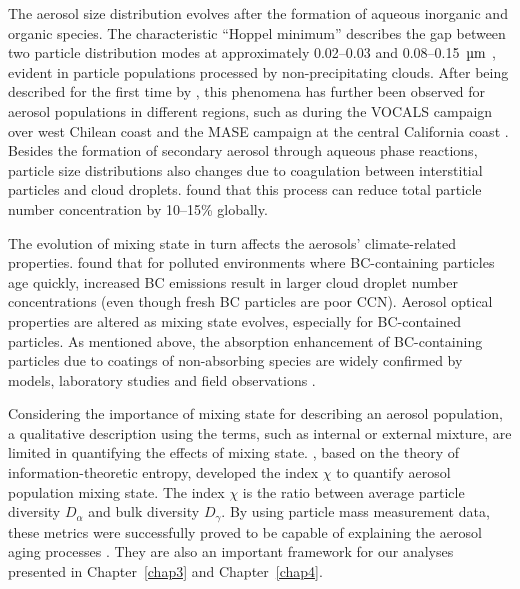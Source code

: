\documentclass[edeposit,fullpage]{uiucthesis2009}
\begin{document}
The aerosol size distribution evolves after the formation of aqueous
inorganic and organic species. The characteristic ``Hoppel minimum''
describes the gap between two particle distribution modes at
approximately 0.02--0.03 and 0.08--0.15~$\rm \mu m$
\citep{Hoppel1986}, evident in particle populations processed by
non-precipitating clouds. After being described for the first time by
\citet{Hoppel1986}, this phenomena has further been observed for
aerosol populations in different regions, such as during the VOCALS
campaign over west Chilean coast \citep{kleinman2012aerosol} and the
MASE campaign at the central California coast
\citep{hudson2015cloud}. Besides the formation of secondary aerosol
through aqueous phase reactions, particle size distributions also
changes due to coagulation between interstitial particles and cloud
droplets. \citet{pierce2015importance} found that this process can
reduce total particle number concentration by 10--15\% globally.

The evolution of mixing state in turn affects the aerosols'
climate-related properties. \citet{Ching2016} found that for polluted
environments where BC-containing particles age quickly, increased BC
emissions result in larger cloud droplet number concentrations (even
though fresh BC particles are poor CCN). Aerosol optical properties
are altered as mixing state evolves, especially for BC-contained
particles. As mentioned above, the absorption enhancement of
BC-containing particles due to coatings of non-absorbing species are
widely confirmed by models, laboratory studies and field observations
\citep{Moffet2009,Liu2017,wu2020light,Fierce2020}.

Considering the importance of mixing state for describing an aerosol
population, a qualitative description using the terms, such as
internal or external mixture, are limited in quantifying the effects
of mixing state. \citet{Riemer2013a}, based on the theory of
information-theoretic entropy, developed the index $\chi$ to quantify
aerosol population mixing state. The index $\chi$ is the ratio between
average particle diversity $D_{\alpha}$ and bulk diversity
$D_{\gamma}$. By using particle mass measurement data, these metrics
were successfully proved to be capable of explaining the aerosol aging
processes \citep{Healy2014}. They are also an important framework for
our analyses presented in Chapter~\ref{chap3} and Chapter~\ref{chap4}.
\end{document}

